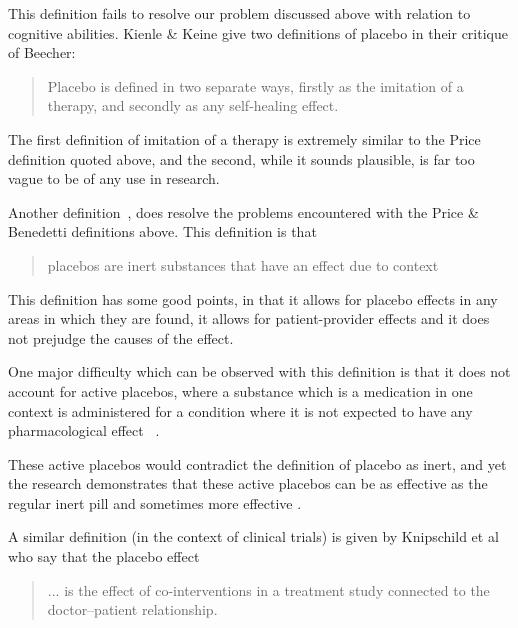 This definition fails to resolve our problem discussed above with relation to cognitive abilities. 
Kienle \& Keine give two definitions of placebo in their critique of Beecher:

\begin{quotation}
Placebo is defined in two separate ways, firstly as the imitation of a
therapy, and secondly as any self-healing effect. 
\end{quotation}

The first definition of imitation of a therapy is extremely similar to the Price definition quoted above, and the second, while it sounds plausible, is far too vague to be of any use in research.

Another definition~\cite{DiBlasi2001}, does resolve the problems encountered with the Price \& Benedetti  definitions above. This definition is that

\begin{quotation}
  placebos are inert substances that have an effect due to context
\end{quotation}

This definition has some good points, in that it allows for placebo effects in any areas in which they are found, it allows for patient-provider effects and it does not prejudge the causes of the effect. 

One major difficulty which can be observed with this definition is that it does not account for active placebos, where a substance which is a medication in one context is administered for a condition where it is not expected to have any pharmacological effect~\cite{Kirsch1998} . 

These active placebos would contradict the definition of placebo as inert, and yet the research demonstrates that these active placebos can be as effective as the regular inert pill \cite{Flaten2004} and sometimes more effective \cite{Kirsch2002a}. 


A similar definition (in the context of clinical trials) is given by Knipschild et al \cite{Knipschild2005} who say that the placebo effect

\begin{quotation}
... is the effect of co-interventions in a
treatment study connected to the doctor--patient relationship.
\end{quotation}

